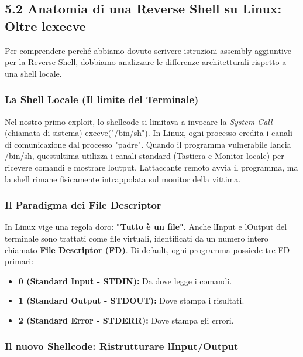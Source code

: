 \documentclass[11pt,a4paper]{article}
\begin{document}
\subsection{5.2 Anatomia di una Reverse Shell su Linux: Oltre
l\textquotesingle execve}\label{anatomia-di-una-reverse-shell-su-linux-oltre-lexecve}

Per comprendere perché abbiamo dovuto scrivere istruzioni assembly
aggiuntive per la Reverse Shell, dobbiamo analizzare le differenze
architetturali rispetto a una shell locale.

\subsubsection{La Shell Locale (Il limite del
Terminale)}\label{la-shell-locale-il-limite-del-terminale}

Nel nostro primo exploit, lo shellcode si limitava a invocare la
\emph{System Call} (chiamata di sistema) execve("/bin/sh"). In Linux,
ogni processo eredita i canali di comunicazione dal processo "padre".
Quando il programma vulnerabile lancia /bin/sh,
quest\textquotesingle ultima utilizza i canali standard (Tastiera e
Monitor locale) per ricevere comandi e mostrare
l\textquotesingle output. L\textquotesingle attaccante remoto avvia il
programma, ma la shell rimane fisicamente intrappolata sul monitor della
vittima.

\subsubsection{Il Paradigma dei File
Descriptor}\label{il-paradigma-dei-file-descriptor}

In Linux vige una regola d\textquotesingle oro: \textbf{"Tutto è un
file"}. Anche l\textquotesingle Input e l\textquotesingle Output del
terminale sono trattati come file virtuali, identificati da un numero
intero chiamato \textbf{File Descriptor (FD)}. Di default, ogni
programma possiede tre FD primari:

\begin{itemize}
\item
  \textbf{0 (Standard Input - STDIN):} Da dove legge i comandi.
\item
  \textbf{1 (Standard Output - STDOUT):} Dove stampa i risultati.
\item
  \textbf{2 (Standard Error - STDERR):} Dove stampa gli errori.
\end{itemize}

\subsubsection{Il nuovo Shellcode: Ristrutturare
l\textquotesingle Input/Output}\label{il-nuovo-shellcode-ristrutturare-linputoutput}
\end{document}
